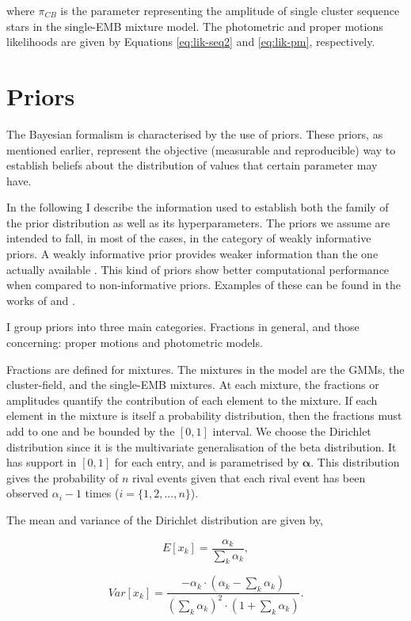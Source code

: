 where $\pi_{CB}$ is the parameter representing the amplitude of single cluster sequence stars in the single-EMB mixture model. The photometric and proper motions likelihoods are given by Equations \ref{eq:lik-seq2} and \ref{eq:lik-pm}, respectively.
 
\section{Priors}
\label{sect:priors}
The Bayesian formalism is characterised by the use of priors. These priors, as mentioned earlier, represent the objective (measurable and reproducible) way to establish beliefs about the distribution of values that certain parameter may have. 

In the following I describe the information used to establish both the family of the prior distribution as well as its hyperparameters. The priors we assume are intended to fall, in most of the cases, in the category of weakly informative priors. A weakly informative prior provides weaker information than the one actually available \citet{Gelman2006}. This kind of priors show better computational performance when compared to non-informative priors. Examples of these can be found in the works of \citet{Gelman2008} and \citet{Chung2015}. 

I group priors into three main categories. Fractions in general, and those concerning: proper motions and photometric models. 

Fractions are defined for mixtures. The mixtures in the model are the GMMs, the cluster-field, and the single-EMB mixtures. At each mixture, the fractions or amplitudes quantify the contribution of each element to the mixture. If each element in the mixture is itself a probability distribution, then the fractions must add to one and be bounded by the $[0,1]$ interval. We choose the Dirichlet distribution since it is the multivariate generalisation of the beta distribution. It has support in $[0,1]$ for each entry, and is parametrised by $\boldsymbol{\alpha}$. This distribution gives the probability of $n$ rival events given that each rival event has been observed $\alpha_i-1$ times ($i=\{1,2,...,n\}$).

The mean and variance of the Dirichlet distribution are given by,

\begin{equation}
E[x_k]=\frac{\alpha_k}{\sum_k \alpha_k},
\end{equation}

\begin{equation}
Var[x_k]=\frac{-\alpha_k\cdot (\alpha_k -\sum_k \alpha_k)}{(\sum_k \alpha_k)^2 \cdot (1+\sum_k \alpha_k)}.
\end{equation}

